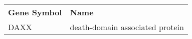 \begin{tabular}{ll}
\toprule
Gene Symbol &                            Name \\
\midrule
       DAXX & death-domain associated protein \\
\bottomrule
\end{tabular}
